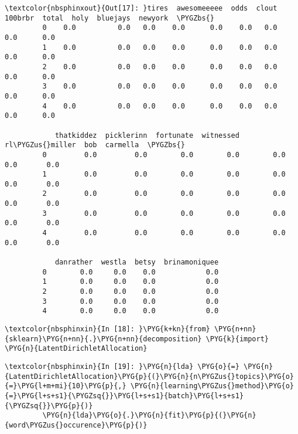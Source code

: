 \documentclass[letterpaper,10pt,english]{sphinxmanual}
\begin{document}
%
\begin{Verbatim}[commandchars=\\\{\}]
\textcolor{nbsphinxout}{Out[17]: }tires  awesomeeeee  odds  clout  100brbr  total  holy  bluejays  newyork  \PYGZbs{}
         0    0.0          0.0   0.0    0.0      0.0    0.0   0.0       0.0      0.0
         1    0.0          0.0   0.0    0.0      0.0    0.0   0.0       0.0      0.0
         2    0.0          0.0   0.0    0.0      0.0    0.0   0.0       0.0      0.0
         3    0.0          0.0   0.0    0.0      0.0    0.0   0.0       0.0      0.0
         4    0.0          0.0   0.0    0.0      0.0    0.0   0.0       0.0      0.0
         
            thatkiddez  picklerinn  fortunate  witnessed  rl\PYGZus{}miller  bob  carmella  \PYGZbs{}
         0         0.0         0.0        0.0        0.0        0.0  0.0       0.0
         1         0.0         0.0        0.0        0.0        0.0  0.0       0.0
         2         0.0         0.0        0.0        0.0        0.0  0.0       0.0
         3         0.0         0.0        0.0        0.0        0.0  0.0       0.0
         4         0.0         0.0        0.0        0.0        0.0  0.0       0.0
         
            danrather  westla  betsy  brinamoniquee
         0        0.0     0.0    0.0            0.0
         1        0.0     0.0    0.0            0.0
         2        0.0     0.0    0.0            0.0
         3        0.0     0.0    0.0            0.0
         4        0.0     0.0    0.0            0.0
\end{Verbatim}

%
\begin{Verbatim}[commandchars=\\\{\}]
\textcolor{nbsphinxin}{In [18]: }\PYG{k+kn}{from} \PYG{n+nn}{sklearn}\PYG{n+nn}{.}\PYG{n+nn}{decomposition} \PYG{k}{import} \PYG{n}{LatentDirichletAllocation}
\end{Verbatim}

%
\begin{Verbatim}[commandchars=\\\{\}]
\textcolor{nbsphinxin}{In [19]: }\PYG{n}{lda} \PYG{o}{=} \PYG{n}{LatentDirichletAllocation}\PYG{p}{(}\PYG{n}{n\PYGZus{}topics}\PYG{o}{=}\PYG{l+m+mi}{10}\PYG{p}{,} \PYG{n}{learning\PYGZus{}method}\PYG{o}{=}\PYG{l+s+s1}{\PYGZsq{}}\PYG{l+s+s1}{batch}\PYG{l+s+s1}{\PYGZsq{}}\PYG{p}{)}
         \PYG{n}{lda}\PYG{o}{.}\PYG{n}{fit}\PYG{p}{(}\PYG{n}{word\PYGZus{}occurence}\PYG{p}{)}
\end{Verbatim}
\end{document}
